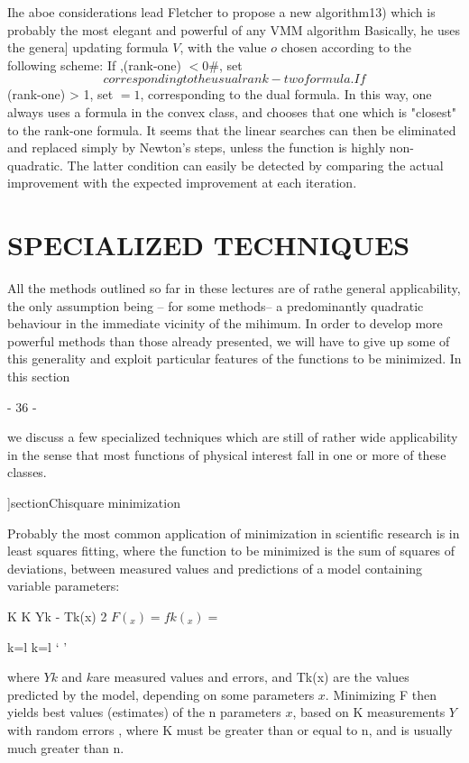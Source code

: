      Ihe aboe considerations lead Fletcher to propose a new algorithm13)
which is probably the most elegant and powerful of any VMM algorithm
Basically, he uses the genera] updating formula $V$, with the value $o$
chosen according to the following scheme:  If ,(rank-one) $< 0$#, set $$
corresponding to the usual  rank-two formula.  If $$ (rank-one) > 1, set
$= 1$, corresponding to the dual formula. In this way, one always uses
a formula in the convex class, and chooses that one which is "closest"
to the rank-one formula.  It seems that the linear searches can then be
eliminated and replaced simply by Newton's steps, unless the function
is highly non-quadratic.  The latter condition can easily be detected by
comparing the actual improvement with the expected improvement at
each iteration.
 
 
\chapter{SPECIALIZED TECHNIQUES}
 
          All the methods outlined so far in these lectures are of rathe
     general applicability, the only assumption being -- for some methods--
     a predominantly quadratic behaviour in the immediate vicinity of the
     mihimum. In order to develop more powerful methods than those already
     presented, we will have to give up some of this generality and exploit
     particular features of the functions to be minimized. In this section
 
                                 - 36 -
 
we discuss a few specialized techniques which are still of rather wide
applicability in the sense that most functions of physical interest
fall in one or more of these classes.
 
]section{Chisquare minimization}
 
     Probably the most common application of minimization in scientific
research is in least squares fitting, where the function to be minimized
is the sum of squares of deviations, between measured values and predictions of a model containing variable parameters:
 
                          K           K   Yk - Tk(x) 2
                $ F(_x) =   fk(_x) =$
 
                     k=l         k=l `         '
 
where $Yk$ and $k $are measured values and errors, and Tk(x) are the values
predicted by the model, depending on some parameters $x$.  Minimizing F
then yields best values (estimates) of the n parameters $x$, based on K
measurements $Y$ with random errors $$, where K must be greater than or
equal to n, and is usually much greater than n.
 

